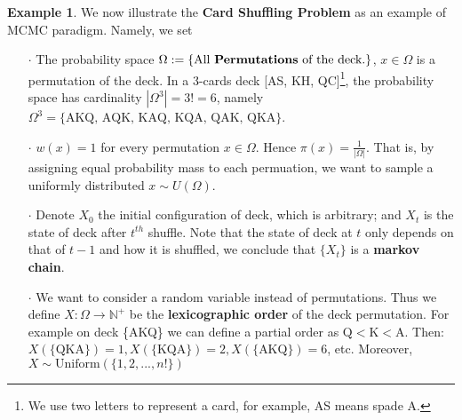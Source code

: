 \documentclass[a4paper, 11pt]{article}
\theoremstyle{definition}
\newtheorem{example}{Example}
\begin{document}
\begin{example} We now illustrate the \textbf{Card Shuffling Problem} as an example of MCMC paradigm. Namely, we set
\begin{itemize}
	\item[$\cdot$] The probability space $\Omega:=\{ \text{All \textbf{Permutations} of the deck.}\}$, $x\in \Omega$ is a permutation of the deck. In a 3-cards deck [AS, KH, QC]\footnote{We use two letters to represent a card, for example, AS means spade A.}, the probability space has cardinality $|\Omega^3|=3!=6$, namely $\Omega^3=\{\text{AKQ, AQK, KAQ, KQA, QAK, QKA}\}$.
	\item[$\cdot$] $w(x)=1$ for every permutation $x\in\Omega$. Hence $\pi(x)=\frac{1}{|\Omega|}$. That is, by assigning equal probability mass to each permuation, we want to sample a uniformly distributed $x\sim U(\Omega)$.
	\item[$\cdot$] Denote $X_0$ the initial configuration of deck, which is arbitrary; and $X_t$ is the state of deck after $t^{th}$ shuffle. Note that the state of deck at $t$ only depends on that of $t-1$ and how it is shuffled, we conclude that $\{X_t\}$ is a \textbf{markov chain}.
  \item[$\cdot$] We want to consider a random variable instead of permutations. Thus we define $X: \Omega \to \mathbb{N}^+$ be the \textbf{lexicographic order} of the deck permutation. For example on deck \{AKQ\} we can define a partial order as $\text{Q}<\text{K}<\text{A}$. Then: $X(\{\text{QKA}\})=1, X(\{\text{KQA}\})=2, X(\{\text{AKQ}\})=6$, etc. Moreover, $X\sim \text{Uniform}(\{1,2,..., n!\})$
\end{itemize}
\end{example}

\end{document}
